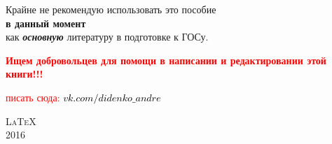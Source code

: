\begin{titlepage}
\mbox{}

Крайне не рекомендую использовать это пособие\\ {\textbf{в данный момент}} \\как \textit{\textbf{основную}} литературу в подготовке к ГОСу. \\

\mbox{}

\textcolor{red}{\Large \textbf{
Ищем добровольцев для помощи в написании и редактировании этой книги!!!}}

\mbox{}

\textcolor{red}{
 писать сюда: \href{https://vk.com/didenko_andre}{\textcolor{black}{ \textcolor{Purplemountainmajesty}{$vk.com/didenko\_andre$}}}
}

\mbox{}

\vfill
{\LARGE\scshape \LaTeX}\\[\baselineskip]
{\LARGE\scshape 2016}\par
\restoregeometry
\end{titlepage}
